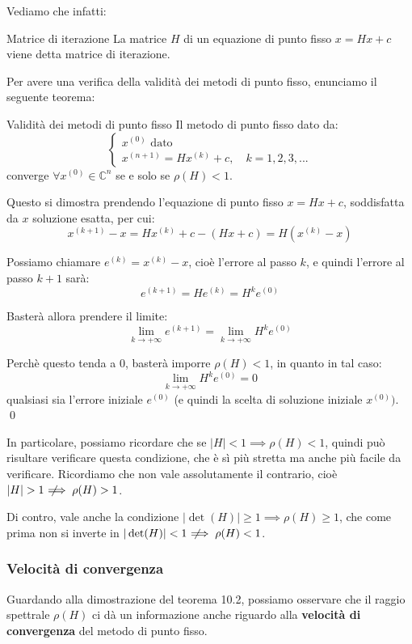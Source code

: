 \documentclass[a4paper,11pt]{article}
\begin{document}
Vediamo che infatti:
\begin{definition}{Matrice di iterazione}
	La matrice $H$ di un equazione di punto fisso $x = H x + c$ viene detta matrice di iterazione.
\end{definition}

Per avere una verifica della validità dei metodi di punto fisso, enunciamo il seguente teorema:
\begin{theorem}{Validità dei metodi di punto fisso}
	Il metodo di punto fisso dato da:
\[
	\begin{cases}
		x^{(0)} \text{ dato} \\
		x^{(n + 1)} = H x^{(k)} + c, \quad k = 1, 2, 3, ...
	\end{cases}
\]
converge $\forall x^{(0)} \in \mathbb{C}^n$ se e solo se $\rho(H) < 1$.
\end{theorem}

Questo si dimostra prendendo l'equazione di punto fisso $x = H x + c$, soddisfatta da $x$ soluzione esatta, per cui:
$$
x^{(k + 1)} - x = H x^{(k)} + c - (H x + c) = H ( x^{(k)} - x )
$$

Possiamo chiamare $e^{(k)} = x^{(k)} - x$, cioè l'errore al passo $k$, e quindi l'errore al passo $k + 1$ sarà:
$$
e^{(k + 1)} = H e^{(k)} = H^k e^{(0)}
$$

Basterà allora prendere il limite:
$$
\lim_{k \rightarrow + \infty} e^{(k + 1)} = \lim_{k \rightarrow + \infty} H^k e^{(0)}
$$

Perchè questo tenda a $0$, basterà imporre $\rho(H) < 1$, in quanto in tal caso:
$$
\lim_{k \rightarrow + \infty} H^k e^{(0)} = 0
$$
qualsiasi sia l'errore iniziale $e^{(0)}$ (e quindi la scelta di soluzione iniziale $x^{(0)})$. \qed

In particolare, possiamo ricordare che se $|H| < 1 \implies \rho(H) < 1$, quindi può risultare verificare questa condizione, che è sì più stretta ma anche più facile da verificare.
Ricordiamo che non vale assolutamente il contrario, cioè $|H| > 1 \;\not\!\!\!\implies \rho(H) > 1$. 

Di contro, vale anche la condizione $|\det(H)| \geq 1 \implies \rho(H) \geq 1$, che come prima non si inverte in $|\det(H)| < 1 \;\not\!\!\!\implies \rho(H) < 1$.

\subsubsection{Velocità di convergenza}
Guardando alla dimostrazione del teorema 10.2, possiamo osservare che il raggio spettrale $\rho(H)$ ci dà un informazione anche riguardo alla \textbf{velocità di convergenza} del metodo di punto fisso.
\end{document}
